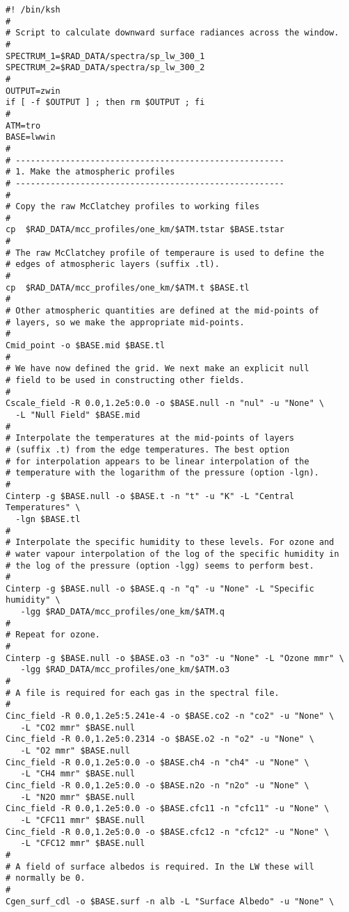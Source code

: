 {\small
\begin{verbatim}
#! /bin/ksh
#
# Script to calculate downward surface radiances across the window.
#
SPECTRUM_1=$RAD_DATA/spectra/sp_lw_300_1
SPECTRUM_2=$RAD_DATA/spectra/sp_lw_300_2
#
OUTPUT=zwin
if [ -f $OUTPUT ] ; then rm $OUTPUT ; fi
#
ATM=tro
BASE=lwwin
#
# ------------------------------------------------------
# 1. Make the atmospheric profiles
# ------------------------------------------------------
#
# Copy the raw McClatchey profiles to working files
#
cp  $RAD_DATA/mcc_profiles/one_km/$ATM.tstar $BASE.tstar
#
# The raw McClatchey profile of temperaure is used to define the
# edges of atmospheric layers (suffix .tl).
#
cp  $RAD_DATA/mcc_profiles/one_km/$ATM.t $BASE.tl
#
# Other atmospheric quantities are defined at the mid-points of
# layers, so we make the appropriate mid-points.
#
Cmid_point -o $BASE.mid $BASE.tl
#
# We have now defined the grid. We next make an explicit null
# field to be used in constructing other fields.
#
Cscale_field -R 0.0,1.2e5:0.0 -o $BASE.null -n "nul" -u "None" \
  -L "Null Field" $BASE.mid
#
# Interpolate the temperatures at the mid-points of layers
# (suffix .t) from the edge temperatures. The best option
# for interpolation appears to be linear interpolation of the
# temperature with the logarithm of the pressure (option -lgn).
#
Cinterp -g $BASE.null -o $BASE.t -n "t" -u "K" -L "Central Temperatures" \
  -lgn $BASE.tl
#
# Interpolate the specific humidity to these levels. For ozone and
# water vapour interpolation of the log of the specific humidity in
# the log of the pressure (option -lgg) seems to perform best.
#
Cinterp -g $BASE.null -o $BASE.q -n "q" -u "None" -L "Specific humidity" \
   -lgg $RAD_DATA/mcc_profiles/one_km/$ATM.q
#
# Repeat for ozone.
#
Cinterp -g $BASE.null -o $BASE.o3 -n "o3" -u "None" -L "Ozone mmr" \
   -lgg $RAD_DATA/mcc_profiles/one_km/$ATM.o3
#
# A file is required for each gas in the spectral file.
#
Cinc_field -R 0.0,1.2e5:5.241e-4 -o $BASE.co2 -n "co2" -u "None" \
   -L "CO2 mmr" $BASE.null
Cinc_field -R 0.0,1.2e5:0.2314 -o $BASE.o2 -n "o2" -u "None" \
   -L "O2 mmr" $BASE.null
Cinc_field -R 0.0,1.2e5:0.0 -o $BASE.ch4 -n "ch4" -u "None" \
   -L "CH4 mmr" $BASE.null
Cinc_field -R 0.0,1.2e5:0.0 -o $BASE.n2o -n "n2o" -u "None" \
   -L "N2O mmr" $BASE.null
Cinc_field -R 0.0,1.2e5:0.0 -o $BASE.cfc11 -n "cfc11" -u "None" \
   -L "CFC11 mmr" $BASE.null
Cinc_field -R 0.0,1.2e5:0.0 -o $BASE.cfc12 -n "cfc12" -u "None" \
   -L "CFC12 mmr" $BASE.null
#
# A field of surface albedos is required. In the LW these will
# normally be 0.
#
Cgen_surf_cdl -o $BASE.surf -n alb -L "Surface Albedo" -u "None" \

\end{verbatim}}
